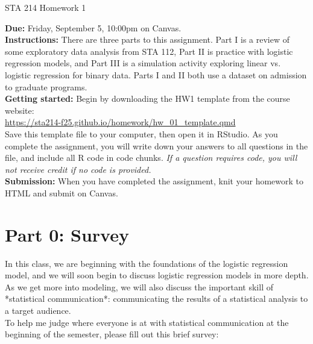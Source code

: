 \documentclass[11pt]{article}
\begin{document}
\begin{center}
\Large
STA 214 Homework 1\\
\normalsize
\vspace{5mm}
\end{center}

\noindent \textbf{Due:} Friday, September 5, 10:00pm on Canvas.\\ 

\noindent \textbf{Instructions:} There are three parts to this assignment. Part I is a review of some exploratory data analysis from STA 112, Part II is practice with logistic regression models, and Part III is a simulation activity exploring linear vs. logistic regression for binary data. Parts I and II both use a dataset on admission to graduate programs.\\

\noindent \textbf{Getting started:} Begin by downloading the HW1 template from the course website:\\

\url{https://sta214-f25.github.io/homework/hw_01_template.qmd}\\

\noindent Save this template file to your computer, then open it in RStudio. As you complete the assignment, you will write down your answers to all questions in the file, and include all R code in code chunks. \textit{If a question requires code, you will not receive credit if no code is provided.}\\

\noindent \textbf{Submission:} When you have completed the assignment, knit your homework to HTML and submit on Canvas.

\section*{Part 0: Survey}

In this class, we are beginning with the foundations of the logistic regression model, and we will soon begin to discuss logistic regression models in more depth. As we get more into modeling, we will also discuss the important skill of *statistical communication*: communicating the results of a statistical analysis to a target audience.\\

\noindent To help me judge where everyone is at with statistical communication at the beginning of the semester, please fill out this brief survey:\\
\end{document}
